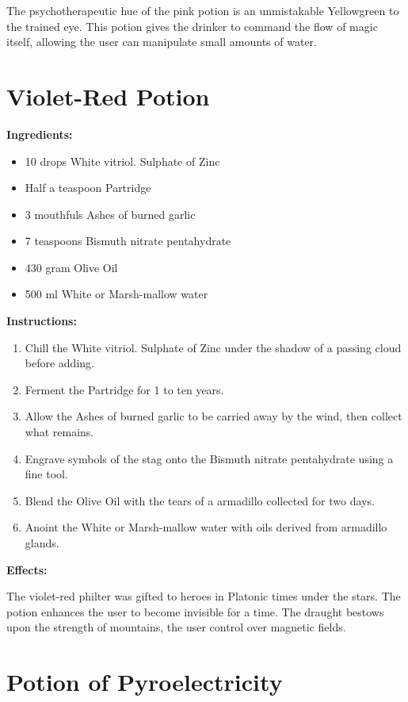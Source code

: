 \documentclass{article}
\begin{document}
The psychotherapeutic hue of the pink potion is an unmistakable Yellowgreen to the trained eye. This potion gives the drinker to command the flow of magic itself, allowing the user can manipulate small amounts of water.

\newpage
\section*{Violet-Red Potion}

\textbf{Ingredients:}

\begin{itemize}
  \item 10 drops White vitriol. Sulphate of Zinc
  \item Half a teaspoon Partridge
  \item 3 mouthfuls Ashes of burned garlic
  \item 7 teaspoons Bismuth nitrate pentahydrate
  \item 430 gram Olive Oil
  \item 500 ml White or Marsh-mallow water
\end{itemize}

\textbf{Instructions:}

\begin{enumerate}
  \item Chill the White vitriol. Sulphate of Zinc under the shadow of a passing cloud before adding.
  \item Ferment the Partridge for 1 to ten years.
  \item Allow the Ashes of burned garlic to be carried away by the wind, then collect what remains.
  \item Engrave symbols of the stag onto the Bismuth nitrate pentahydrate using a fine tool.
  \item Blend the Olive Oil with the tears of a armadillo collected for two days.
  \item Anoint the White or Marsh-mallow water with oils derived from armadillo glands.
\end{enumerate}

\textbf{Effects:}

The violet-red philter was gifted to heroes in Platonic times under the stars. The potion enhances the user to become invisible for a time. The draught bestows upon the strength of mountains, the user control over magnetic fields.

\newpage
\section*{Potion of Pyroelectricity}
\end{document}
